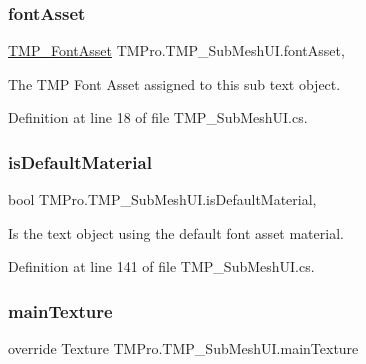 \subsubsection{\texorpdfstring{fontAsset}{fontAsset}}
{\footnotesize\ttfamily \mbox{\hyperlink{class_t_m_pro_1_1_t_m_p___font_asset}{T\+M\+P\+\_\+\+Font\+Asset}} T\+M\+Pro.\+T\+M\+P\+\_\+\+Sub\+Mesh\+U\+I.\+font\+Asset\hspace{0.3cm}{\ttfamily [get]}, {\ttfamily [set]}}



The T\+MP Font Asset assigned to this sub text object. 



Definition at line 18 of file T\+M\+P\+\_\+\+Sub\+Mesh\+U\+I.\+cs.

\mbox{\label{class_t_m_pro_1_1_t_m_p___sub_mesh_u_i_afeb2c2de9cff26385cf00802a8d356da}} 
\subsubsection{\texorpdfstring{isDefaultMaterial}{isDefaultMaterial}}
{\footnotesize\ttfamily bool T\+M\+Pro.\+T\+M\+P\+\_\+\+Sub\+Mesh\+U\+I.\+is\+Default\+Material\hspace{0.3cm}{\ttfamily [get]}, {\ttfamily [set]}}



Is the text object using the default font asset material. 



Definition at line 141 of file T\+M\+P\+\_\+\+Sub\+Mesh\+U\+I.\+cs.

\mbox{\label{class_t_m_pro_1_1_t_m_p___sub_mesh_u_i_a455c7c479e81a37c0de77570b4bf3578}} 
\subsubsection{\texorpdfstring{mainTexture}{mainTexture}}
{\footnotesize\ttfamily override Texture T\+M\+Pro.\+T\+M\+P\+\_\+\+Sub\+Mesh\+U\+I.\+main\+Texture\hspace{0.3cm}{\ttfamily [get]}}







